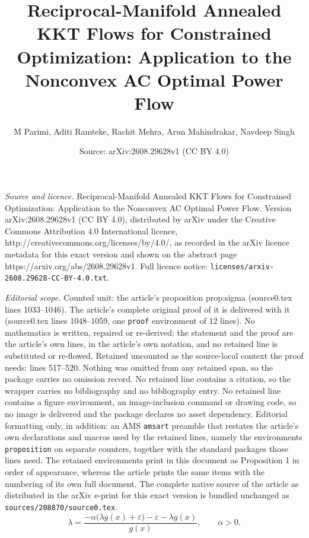 \documentclass[10pt,a4paper]{amsart}
\title{Reciprocal-Manifold Annealed KKT Flows for Constrained Optimization: Application to the Nonconvex AC Optimal Power Flow}
\author{M Parimi, Aditi Ramteke, Rachit Mehra, Arun Mahindrakar, Navdeep Singh}
\date{Source: arXiv:2608.29628v1 (CC BY 4.0)}
\begin{document}
\maketitle

\noindent\emph{Source and licence.} Reciprocal-Manifold Annealed KKT Flows for Constrained Optimization: Application to the Nonconvex AC Optimal Power Flow. Version arXiv:2608.29628v1 (CC BY 4.0), distributed by arXiv under the Creative Commons Attribution 4.0 International licence, http://creativecommons.org/licenses/by/4.0/, as recorded in the arXiv licence metadata for this exact version and shown on the abstract page https://arxiv.org/abs/2608.29628v1. Full licence notice: \texttt{licenses/arxiv-2608.29628-CC-BY-4.0.txt}.\par\smallskip

\noindent\textit{Editorial scope.} Counted unit: the article's proposition prop:sigma (source0.tex lines 1033--1046). The article's complete original proof of it is delivered with it (source0.tex lines 1048--1059, one \texttt{proof} environment of 12 lines). No mathematics is written, repaired or re-derived: the statement and the proof are the article's own lines, in the article's own notation, and no retained line is substituted or re-flowed.  Retained uncounted as the source-local context the proof needs: lines 517--520.  Nothing was omitted from any retained span, so the package carries no omission record.  No retained line contains a citation, so the wrapper carries no bibliography and no bibliography entry.  No retained line contains a figure environment, an image-inclusion command or drawing code, so no image is delivered and the package declares no asset dependency.  Editorial formatting only, in addition: an AMS \texttt{amsart} preamble that restates the article's own declarations and macros used by the retained lines, namely the environments \texttt{proposition} on separate counters, together with the standard packages those lines need.  The retained environments print in this document as Proposition 1 in order of appearance, whereas the article prints the same items with the numbering of its own full document.  The complete native source of the article as distributed in the arXiv e-print for this exact version is bundled unchanged as \texttt{sources/208870/source0.tex}.
\begin{equation}
\dot\lambda = \frac{-\alpha\big(\lambda g(x) + \varepsilon\big) - \dot\varepsilon
  - \lambda \dot g(x)}{g(x)}, \qquad \alpha > 0. \label{eq:multiplierlaw}
\end{equation}
\end{document}
